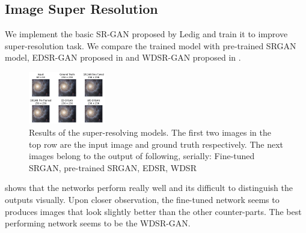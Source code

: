 \documentclass[10pt,twocolumn,letterpaper]{article}
\begin{document}
    \subsection{Image Super Resolution}
    \hspace*{0.167 in}We implement the basic SR-GAN proposed by Ledig \etal \cite{ledig2017photorealistic} and train it to improve super-resolution task. We compare the trained model with pre-trained SRGAN model, EDSR-GAN proposed in \cite{lim2017enhanced} and WDSR-GAN proposed in \cite{yu2018wide}.
    \begin{figure}[!htb]
    \centering
    	\includegraphics[width=0.3\textwidth]{figures/comparison_upscale}
    	\caption{Results of the super-resolving models. The first two images in the top row are the input image and ground truth respectively. The next images belong to the output of following, serially: Fine-tuned SRGAN, pre-trained SRGAN, EDSR, WDSR}
    	\label{fig: sr_results}
    \end{figure}
     shows that the networks perform really well and its difficult to distinguish the outputs visually. Upon closer observation, the fine-tuned network seems to produces images that look slightly better than the other counter-parts. The best performing network seems to be the WDSR-GAN.
\end{document}

